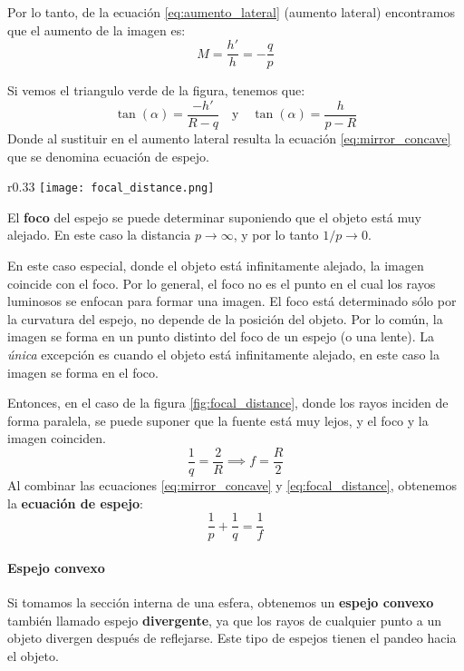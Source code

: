Por lo tanto, de la ecuación \ref{eq:aumento_lateral} (aumento lateral) encontramos que el aumento de la imagen es:
\begin{equation}
  M = \frac{h'}{h} = -\frac{q}{p}
  \label{eq:aumento_lateral_concave}
\end{equation}

Si vemos el triangulo verde de la figura, tenemos que:
\[
  \tan(\alpha) = \frac{-h'}{R-q} \quad \text{y} \quad \tan(\alpha) = \frac{h}{p-R}
\]
Donde al sustituir en el aumento lateral resulta la ecuación \ref{eq:mirror_concave} que se denomina ecuación de espejo.

\begin{wrapfigure}{r}{0.33\textwidth}
  \centering
  \texttt{[image: focal\_distance.png]}
  \caption{Foco de un espejo cóncavo.}
  \label{fig:focal_distance}
\end{wrapfigure}
El \textbf{foco} del espejo se puede determinar suponiendo que el objeto está muy alejado. En este caso la distancia \(p \to \infty\), y por lo tanto \(1/p \to 0\). 

En este caso especial, donde el objeto está infinitamente alejado, la imagen coincide con el foco. Por lo general, el foco no es el punto en el cual los rayos luminosos se enfocan para formar una imagen. El foco está determinado sólo por la curvatura del espejo, no depende de la posición del objeto. Por lo común, la imagen se forma en un punto distinto del foco de un espejo (o una lente). La \textit{única} excepción es cuando el objeto está infinitamente alejado, en este caso la imagen se forma en el foco.

Entonces, en el caso de la figura \ref{fig:focal_distance}, donde los rayos inciden de forma paralela, se puede suponer que la fuente está muy lejos, y el foco y la imagen coinciden. 
\begin{equation}
  \frac{1}{q} = \frac{2}{R} \implies f = \frac{R}{2}
  \label{eq:focal_distance}
\end{equation}
Al combinar las ecuaciones \ref{eq:mirror_concave} y \ref{eq:focal_distance}, obtenemos la \textbf{ecuación de espejo}:
\begin{equation}
  \frac{1}{p} + \frac{1}{q} = \frac{1}{f}
\end{equation}

\paragraph{Espejo convexo}

Si tomamos la sección interna de una esfera, obtenemos un \textbf{espejo convexo} también llamado espejo \textbf{divergente}, ya que los rayos de cualquier punto a un objeto divergen después de reflejarse. Este tipo de espejos tienen el pandeo hacia el objeto.

